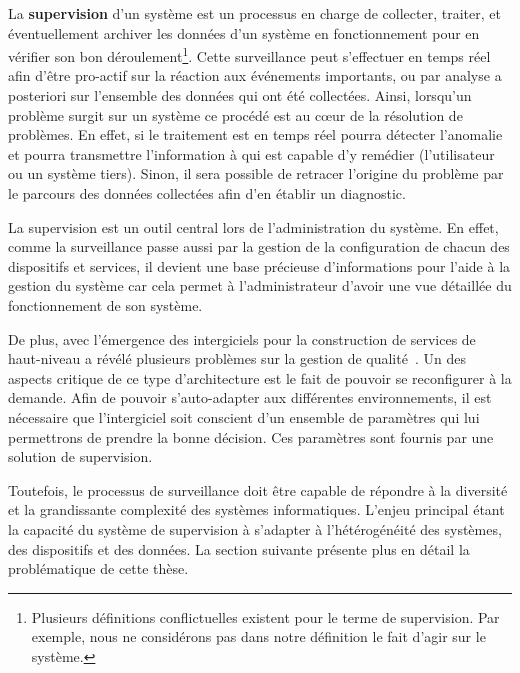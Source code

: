 La \textbf{supervision} d'un système est un processus en charge de collecter, traiter, et éventuellement archiver les données d'un système en fonctionnement pour en vérifier son bon déroulement\footnote{Plusieurs définitions conflictuelles existent pour le terme de supervision. Par exemple, nous ne considérons pas dans notre définition le fait d'agir sur le système.}. Cette surveillance peut s'effectuer en temps réel afin d'être pro-actif sur la réaction aux événements importants, ou par analyse a posteriori sur l'ensemble des données qui ont été collectées. Ainsi, lorsqu'un problème surgit sur un système ce procédé est au cœur de la résolution de problèmes. En effet, si le traitement est en temps réel pourra détecter l'anomalie et pourra transmettre l'information à qui est capable d'y remédier (l'utilisateur ou un système tiers). Sinon, il sera possible de retracer l'origine du problème par le parcours des données collectées afin d'en établir un diagnostic.

La supervision est un outil central lors de l'administration du système. En effet, comme la surveillance passe aussi par la gestion de la configuration de chacun des dispositifs et services, il devient une base précieuse d'informations pour l'aide à la gestion du système car cela permet à l'administrateur d'avoir une vue détaillée du fonctionnement de son système.

De plus, avec l'émergence des intergiciels pour la construction de services de haut-niveau a révélé plusieurs problèmes sur la gestion de qualité~\cite{Geihs:challenges}. Un des aspects critique de ce type d'architecture est le fait de pouvoir se reconfigurer à la demande. Afin de pouvoir s'auto-adapter aux différentes environnements, il est nécessaire que l'intergiciel soit conscient d'un ensemble de paramètres qui lui permettrons de prendre la bonne décision. Ces paramètres sont fournis par une solution de supervision.

Toutefois, le processus de surveillance doit être capable de répondre à la diversité et la grandissante complexité des systèmes informatiques. L'enjeu principal étant la capacité du système de supervision à s'adapter à l'hétérogénéité des systèmes, des dispositifs et des données. La section suivante présente plus en détail la problématique de cette thèse.